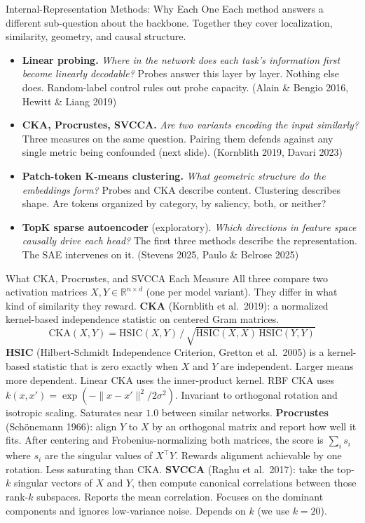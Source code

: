 \documentclass{beamer}
\begin{document}
\begin{frame}{Internal-Representation Methods: Why Each One}
\footnotesize
Each method answers a different sub-question about the backbone. Together they cover localization, similarity, geometry, and causal structure.
\vfill
\begin{itemize}\setlength\itemsep{3pt}
  \item \textbf{Linear probing.} \emph{Where in the network does each task's information first become linearly decodable?} Probes answer this layer by layer. Nothing else does. Random-label control rules out probe capacity. (Alain \& Bengio 2016, Hewitt \& Liang 2019)
  \item \textbf{CKA, Procrustes, SVCCA.} \emph{Are two variants encoding the input similarly?} Three measures on the same question. Pairing them defends against any single metric being confounded (next slide). (Kornblith 2019, Davari 2023)
  \item \textbf{Patch-token K-means clustering.} \emph{What geometric structure do the embeddings form?} Probes and CKA describe content. Clustering describes shape. Are tokens organized by category, by saliency, both, or neither?
  \item \textbf{TopK sparse autoencoder} (exploratory). \emph{Which directions in feature space causally drive each head?} The first three methods describe the representation. The SAE intervenes on it. (Stevens 2025, Paulo \& Belrose 2025)
\end{itemize}
\end{frame}

\begin{frame}{What CKA, Procrustes, and SVCCA Each Measure}
\scriptsize
All three compare two activation matrices $X, Y \in \mathbb{R}^{n \times d}$ (one per model variant). They differ in what kind of similarity they reward.
\vfill
\textbf{CKA} (Kornblith et al.\ 2019): a normalized kernel-based independence statistic on centered Gram matrices.
\begin{equation*}
\mathrm{CKA}(X, Y) = \mathrm{HSIC}(X, Y) \,/\, \sqrt{\mathrm{HSIC}(X, X)\, \mathrm{HSIC}(Y, Y)}
\end{equation*}
\textbf{HSIC} (Hilbert-Schmidt Independence Criterion, Gretton et al.\ 2005) is a kernel-based statistic that is zero exactly when $X$ and $Y$ are independent. Larger means more dependent. Linear CKA uses the inner-product kernel. RBF CKA uses $k(x, x') = \exp(-\|x - x'\|^2 / 2\sigma^2)$. Invariant to orthogonal rotation and isotropic scaling. Saturates near $1.0$ between similar networks.
\vfill
\textbf{Procrustes} (Schönemann 1966): align $Y$ to $X$ by an orthogonal matrix and report how well it fits. After centering and Frobenius-normalizing both matrices, the score is $\sum_i s_i$ where $s_i$ are the singular values of $X^\top Y$. Rewards alignment achievable by one rotation. Less saturating than CKA.
\vfill
\textbf{SVCCA} (Raghu et al.\ 2017): take the top-$k$ singular vectors of $X$ and $Y$, then compute canonical correlations between those rank-$k$ subspaces. Reports the mean correlation. Focuses on the dominant components and ignores low-variance noise. Depends on $k$ (we use $k=20$).
\end{frame}
\end{document}
